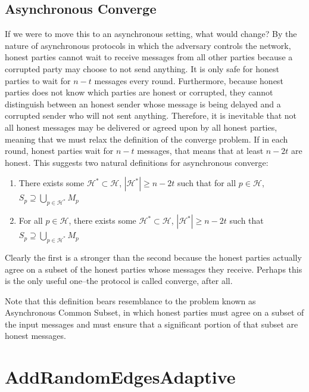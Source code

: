 \documentclass{article}
\begin{document}
\subsection{Asynchronous Converge}
If we were to move this to an asynchronous setting, what would change? By the nature of asynchronous protocols in which the adversary controls the network, honest parties cannot wait to receive messages from all other parties because a corrupted party may choose to not send anything. It is only safe for honest parties to wait for $n - t$ messages every round. Furthermore, because honest parties does not know which parties are honest or corrupted, they cannot distinguish between an honest sender whose message is being delayed and a corrupted sender who will not sent anything. Therefore, it is inevitable that not all honest messages may be delivered or agreed upon by all honest parties, meaning that we must relax the definition of the converge problem. If in each round, honest parties wait for $n - t$ messages, that means that at least $n - 2t$ are honest. This suggests two natural definitions for asynchronous converge:
\begin{enumerate}
    \item There exists some $\mathcal H^* \subset \mathcal H$, $|\mathcal H^*| \geq n-2t$ such that for all $p \in \mathcal H$, $S_p \supseteq \bigcup\limits_{p \in \mathcal H^*} M_p$ 
    \item For all $p \in \mathcal H$, there exists some $\mathcal H^* \subset \mathcal H$, $|\mathcal H^*| \geq n-2t$ such that $S_p \supseteq \bigcup\limits_{p \in \mathcal H^*} M_p$ 
\end{enumerate}

Clearly the first is a stronger than the second because the honest parties actually agree on a subset of the honest parties whose messages they receive. Perhaps this is the only useful one--the protocol is called converge, after all.

Note that this definition bears resemblance to the problem known as Asynchronous Common Subset, in which honest parties must agree on a subset of the input messages and must ensure that a significant portion of that subset are honest messages.

\section{AddRandomEdgesAdaptive}
\end{document}
